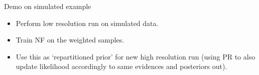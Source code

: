 \documentclass[aspectratio=169, 11pt]{beamer}
\begin{document}
\begin{frame}{Demo on simulated example}
\begin{minipage}{0.45\textwidth}\vspace{1em}
\begin{itemize}
    \item<1-> Perform low resolution run on simulated data.
    \item<2-> Train NF on the weighted samples.
    \item<3-> Use this as `repartitioned prior' for new high resolution run (using PR to also update likelihood accordingly to same evidences and posteriors out).
\end{itemize}
\end{minipage}
\begin{minipage}{0.45\textwidth}
\end{minipage}
\end{frame}
\end{document}
